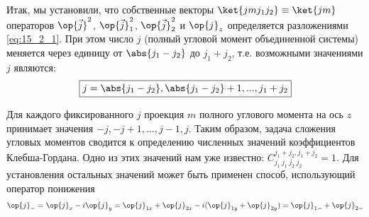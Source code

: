 Итак, мы установили, что собственные векторы $\ket{j m j_1 j_2} \equiv \ket{j m}$ операторов $\op{\vec{j}}^2$, $\op{\vec{j}}_1^2$, $\op{\vec{j}}_2^2$ и $\op{j}_z$ определяется разложениями \eqref{eq:15_2_1}. При этом число $j$ (полный угловой момент объединенной системы) меняется через единицу от $\abs{j_1 - j_2}$ до $j_1 + j_2$, т.е. возможными значениями $j$ являются:
\begin{equation}
\label{eq:15_2_4}
\boxed{j = \abs{j_1 - j_2}, \abs{j_1 - j_2} + 1, ..., j_1 + j_2}
\end{equation}

Для каждого фиксированного $j$ проекция $m$ полного углового момента на ось $z$ принимает значения $-j, -j + 1, ..., j -1, j$. Таким образом, задача сложения угловых моментов сводится к определению численных значений коэффициентов Клебша-Гордана. Одно из этих значений нам уже известно: $C^{j_1+j_2, j_1 + j_2}_{j_1~j_1~j_2~j_2} = 1$. Для установления остальных значений может быть применен способ, использующий оператор понижения
\begin{gather*}
\op{j}_- = \op{j}_x - i \op{j}_y = \op{j}_{1x} + \op{j}_{2x} - i (\op{j}_{1y} + \op{j}_{2y}) = \op{j}_{1-} + \op{j}_{2-}
\end{gather*}